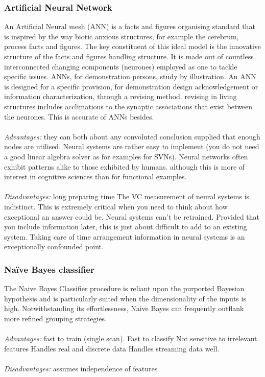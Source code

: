 \documentclass[12pt, letterpaper]{article}
\begin{document}
\subsubsection{Artificial Neural Network}
An Artificial Neural mesh (ANN) is a facts and figures organising standard that is inspired by the way biotic anxious structures, for example the cerebrum, process facts and figures. The key constituent of this ideal model is the innovative structure of the facts and figures handling structure. It is made out of countless interconnected changing components (neurones) employed as one to tackle specific issues. ANNs, for demonstration persons, study by illustration. An ANN is designed for a specific provision, for demonstration design acknowledgement or information characterization, through a revising method. revising in living structures includes acclimations to the synaptic associations that exist between the neurones. This is accurate of ANNs besides.
\\
\\
\emph{Advantages:} they can both about any convoluted conclusion supplied that enough nodes are utilised. Neural systems are rather easy to implement (you do not need a good linear algebra solver as for examples for SVNs). Neural networks often exhibit patterns alike to those exhibited by humans. although this is more of interest in cognitive sciences than for functional examples.
\\
\\
\emph{Disadvantages:} long preparing time The VC measurement of neural systems is indistinct. This is extremely critical when you need to think about how exceptional an answer could be. Neural systems can't be retrained. Provided that you include information later, this is just about difficult to add to an existing system. Taking care of time arrangement information in neural systems is an exceptionally confounded point.
\\
\subsubsection{Naïve Bayes classifier}
The Naive Bayes Classifier procedure is reliant upon the purported Bayesian hypothesis and is particularly suited when the dimensionality of the inputs is high. Notwithstanding its effortlessness, Naive Bayes can frequently outflank more refined grouping strategies.
\\
\\
\emph{Advantages:} fast to train (single scan). Fast to classify Not sensitive to irrelevant features Handles real and discrete data Handles streaming data well.
\\
\\
\emph{Disadvantages:} assumes independence of features
\end{document}
